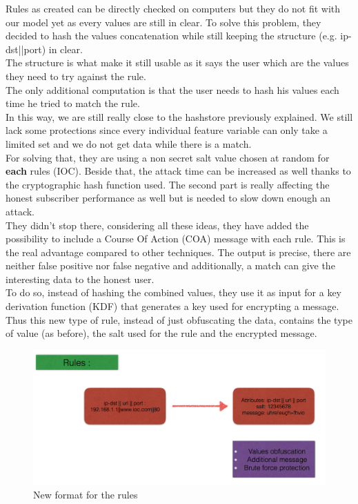 \documentclass{eplmastersthesis}
\begin{document}
Rules as created can be directly checked on computers but they do not fit with our model yet as every values are still in clear. To solve this problem, they decided to hash the values concatenation while still keeping the structure (e.g. ip-dst||port) in clear.\\
The structure is what make it still usable as it says the user which are the values they need to try against the rule.\\
The only additional computation is that the user needs to hash his values each time he tried to match the rule.\\
In this way, we are still really close to the hashstore previously explained. We still lack some protections since every individual feature variable can only take a limited set and we do not get data while there is a match.\\
For solving that, they are using a non secret salt value chosen at random for \textbf{each} rules (IOC). Beside that, the attack time can be increased as well thanks to the cryptographic hash function used. The second part is really affecting the honest subscriber performance as well but is needed to slow down enough an attack.\\

They didn't stop there, considering all these ideas, they have added the possibility to include a Course Of Action (COA) message with each rule. This is the real advantage compared to other techniques. The output is precise, there are neither false positive nor false negative and additionally, a match can give the interesting data to the honest user.\\ To do so, instead of hashing the combined values, they use it as input for a key derivation function (KDF) that generates a key used for encrypting a message.\\
Thus this new type of rule, instead of just obfuscating the data, contains the type of value (as before), the salt used for the rule and the encrypted message.\\


\begin{figure}[h!]
\begin{center}
	\includegraphics[scale=0.3]{res/obfuscation-rule}
	\caption{New format for the rules}
	\label{Obfuscation-Rule}
\end{center}
\end{figure}
\end{document}
